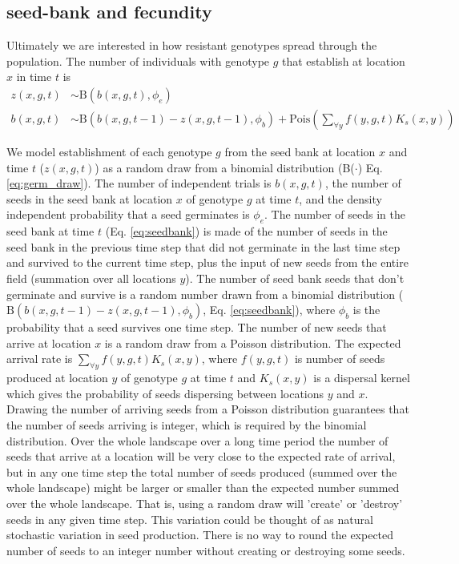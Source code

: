 \documentclass[12pt, a4paper]{article}
\begin{document}
\subsection*{seed-bank and fecundity}
Ultimately we are interested in how resistant genotypes spread through the population. The number of individuals with genotype $g$ that establish at location $x$ in time $t$ is 
\begin{subequations}
\label{eq:germ}
\begin{align}
	\label{eq:germ_draw}
	z(x, g, t) &\sim  \text{B}(b(x, g, t), \phi_e)\\
	\label{eq:seedbank}
	b(x, g, t) &\sim \text{B}(b(x, g, t - 1) - z(x, g, t - 1), \phi_b) + \text{Pois}\left(\displaystyle\sum_{\forall y}f(y, g, t)K_s(x,y)\right)  
\end{align}
\end{subequations} 

We model establishment of each genotype $g$ from the seed bank at location $x$ and time $t$ ($z(x, g, t)$) as a random draw from a binomial distribution (B($\cdot$) Eq. \ref{eq:germ_draw}). The number of independent trials is $b(x, g, t)$, the number of seeds in the seed bank at location $x$ of genotype $g$ at time $t$, and the density independent probability that a seed germinates is $\phi_e$. The number of seeds in the seed bank at time $t$ (Eq. \ref{eq:seedbank}) is made of the number of seeds in the seed bank in the previous time step that did not germinate in the last time step and survived to the current time step, plus the input of new seeds from the entire field (summation over all locations $y$). The number of seed bank seeds that don't germinate and survive is a random number drawn from a binomial distribution ($\text{B}(b(x, g, t - 1) - z(x, g, t - 1), \phi_b)$, Eq. \ref{eq:seedbank}), where $\phi_b$ is the probability that a seed survives one time step. The number of new seeds that arrive at location $x$ is a random draw from a Poisson distribution. The expected arrival rate is $\sum_{\forall y}f(y, g, t)K_s(x,y)$, where $f(y, g, t)$ is number of seeds produced at location $y$ of genotype $g$ at time $t$ and $K_s(x,y)$ is a dispersal kernel which gives the probability of seeds dispersing between locations $y$ and $x$. Drawing the number of arriving seeds from a Poisson distribution guarantees that the number of seeds arriving is integer, which is required by the binomial distribution. Over the whole landscape over a long time period the number of seeds that arrive at a location will be very close to the expected rate of arrival, but in any one time step the total number of seeds produced (summed over the whole landscape) might be larger or smaller than the expected number summed over the whole landscape. That is, using a random draw will 'create' or 'destroy' seeds in any given time step. This variation could be thought of as natural stochastic variation in seed production. There is no way to round the expected number of seeds to an integer number without creating or destroying some seeds.                                  
\end{document}
